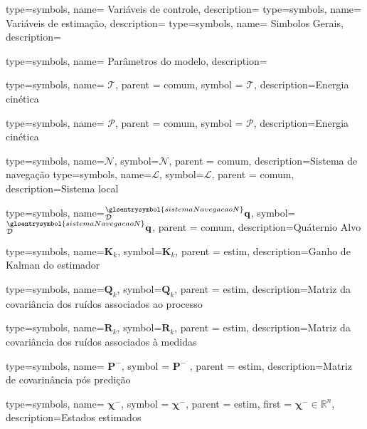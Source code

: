 {type=symbols,
  name= Variáveis de controle,
description={}
  }
{type=symbols,
  name= Variáveis de estimação,
description={}
}
{type=symbols,
  name= {Simbolos Gerais},
description={}
}

{type=symbols,
  name= {Parâmetros do modelo},
description={}
}

{type=symbols,
  name= \ensuremath{\mathcal{T}},
  parent = {comum},
  symbol = \ensuremath{\mathcal{T}},
  description={Energia cinética}
}

{type=symbols,
  name= \ensuremath{\mathcal{P}},
  parent = {comum},
  symbol = \ensuremath{\mathcal{P}},
  description={Energia cinética}
}

{type=symbols,
  name=\ensuremath{\mathcal{N}},
  symbol=\ensuremath{\mathcal{N}},
  parent = comum,
  description={Sistema de navegação}
}
{type=symbols,
  name=\ensuremath{\mathcal{L}},
  symbol=\ensuremath{\mathcal{L}},
parent = comum,
description={Sistema local}
}

{type=symbols,
    name={\ensuremath{{}_{\mathcal{D}}^{\glsentrysymbol{sistemaNavegacaoN}}\mathbf{q}}},
   symbol={\ensuremath{{}_{\mathcal{D}}^{\glsentrysymbol{sistemaNavegacaoN}}\mathbf{q}}},
parent = comum,
  description={Quáternio Alvo}
}


{type=symbols,
  name=\ensuremath{\mathbf{K}_{k}},
   symbol=\ensuremath{\mathbf{K}_{k}},
    parent = estim,
  description={Ganho de Kalman do estimador}
}

{type=symbols,
  name=\ensuremath{\mathbf{Q}_{k}},
   symbol=\ensuremath{\mathbf{Q}_{k}},
    parent = estim,
  description={Matriz da covariância dos ruídos associados ao processo}
}

{type=symbols,
  name=\ensuremath{\mathbf{R}_{k}},
   symbol=\ensuremath{\mathbf{R}_{k}},
    parent = estim,
  description={Matriz da covariância dos ruídos associados à medidas}
}

{type=symbols,
  name= \ensuremath{\mathbf{P}^{-}},
  symbol = \ensuremath{\mathbf{P}^{-}} ,
parent = estim,
  description={Matriz de covarinância pós predição}
}


{type=symbols,
  name= \ensuremath{\boldsymbol{\chi}^{-}},
  symbol = \ensuremath{\boldsymbol{\chi}^{-}},
parent = estim,
  first = \ensuremath{\boldsymbol{\chi}^{-} \in\mathbb{R}^{n}},
  description={Estados estimados}
}

